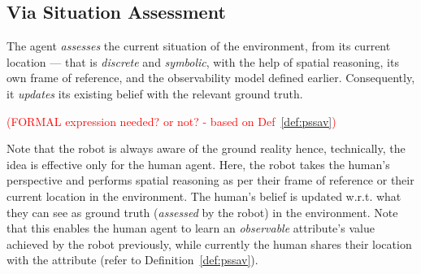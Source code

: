 \documentclass[letterpaper]{article} %
\begin{document}
\subsection{Via Situation Assessment}

The agent \textit{assesses} the current situation of the environment, from its current location --- that is \textit{discrete} and \textit{symbolic}, with the help of spatial reasoning, its own frame of reference, and the observability model defined earlier. Consequently, it \textit{updates} its existing belief with the relevant ground truth. 

\textcolor{red}{(FORMAL expression needed? or not? - based on Def~\ref{def:pssav})}

Note that the robot is always aware of the ground reality hence, technically, the idea 
is effective only for the human agent. Here, the robot takes the human's perspective and performs spatial reasoning as per their frame of reference or their current location in the environment. The human's belief is updated w.r.t. what they can see as ground truth (\textit{assessed} by the robot) in the environment. Note that this enables the human agent to learn an \textit{observable} attribute's value achieved by the robot previously, while currently the human shares their location with the attribute (refer to Definition~\ref{def:pssav}). 
% 
\end{document}
